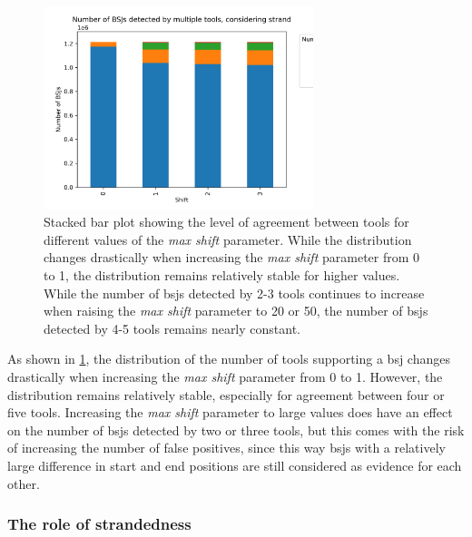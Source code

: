 \begin{figure}[H]
    \centering

    \includegraphics[width=0.7\textwidth]{chapters/4_results_and_discussion/figures/detection/shift_agreement_stranded.png}
    \caption{Stacked bar plot showing the level of agreement between tools for
        different values of the \textit{max shift} parameter.
        While the distribution changes drastically when increasing the \textit{max
            shift} parameter from 0 to 1, the distribution remains relatively stable for
        higher values.
        While the number of \glspl{bsj} detected by 2-3 tools continues to increase
        when raising the \textit{max shift} parameter to 20 or 50, the number of
        \glspl{bsj} detected by 4-5 tools remains nearly constant.
    }
    \label{fig:shift_agreement_stranded}
\end{figure}

As shown in \cref{fig:shift_agreement_stranded}, the distribution of the number
of tools supporting a \gls{bsj} changes drastically when increasing the
\textit{max shift} parameter from 0 to 1.
However, the distribution remains relatively stable, especially for agreement
between four or five tools.
Increasing the \textit{max shift} parameter to large values does have an effect
on the number of \glspl{bsj} detected by two or three tools, but this comes
with the risk of increasing the number of false positives, since this way
\glspl{bsj} with a relatively large difference in start and end positions are
still considered as evidence for each other.

\subsubsection{The role of strandedness}

